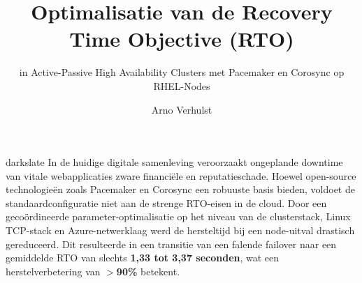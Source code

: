 \documentclass[a0,portrait]{hogent-poster}
\title{Optimalisatie van de Recovery Time Objective (RTO)}
\subtitle{in Active-Passive High Availability Clusters met Pacemaker en Corosync op RHEL-Nodes}
\author{Arno Verhulst}
\begin{document}
   
    \pagecolor{posterbg}
    
    \maketitle
    
    \begin{center}
        \begin{minipage}{0.96\linewidth}
            \begin{onderzoekskaart}[SAMENVATTING]{darkslate}
                \large In de huidige digitale samenleving veroorzaakt ongeplande downtime van vitale webapplicaties zware financiële en reputatieschade. Hoewel open-source technologieën zoals Pacemaker en Corosync een robuuste basis bieden, voldoet de standaardconfiguratie niet aan de strenge RTO-eisen in de cloud. Door een gecoördineerde parameter-optimalisatie op het niveau van de clusterstack, Linux TCP-stack en Azure-netwerklaag werd de hersteltijd bij een node-uitval drastisch gereduceerd. Dit resulteerde in een transitie van een falende failover naar een gemiddelde RTO van slechts \textbf{1,33 tot 3,37 seconden}, wat een herstelverbetering van \textbf{$>$90\%} betekent.
            \end{onderzoekskaart}
        \end{minipage}
    \end{center}
    
    \vspace{0.5cm}
    
\end{document}
